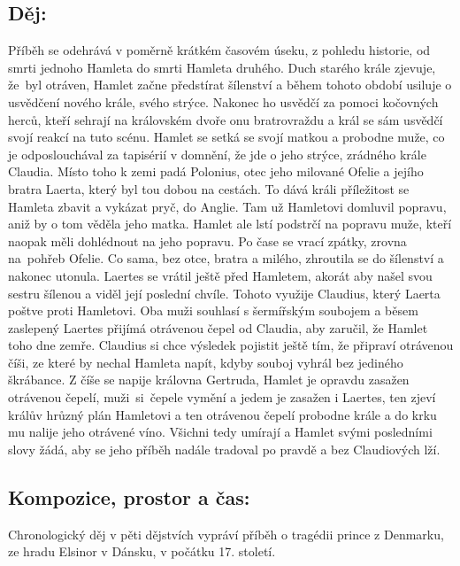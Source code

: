 \documentclass{extarticle} %
\begin{document}
\subsection*{Děj:}
\noindent 
Příběh se odehrává v poměrně krátkém časovém úseku, z pohledu historie, od smrti jednoho Hamleta do smrti Hamleta druhého.
Duch starého krále zjevuje, že~byl otráven, Hamlet začne předstírat šílenství a během tohoto období usiluje o usvědčení nového krále, svého strýce.
Nakonec ho usvědčí za pomoci kočovných herců, kteří sehrají na královském dvoře onu bratrovraždu a král se sám usvědčí svojí reakcí na tuto scénu.
Hamlet se setká se svojí matkou a probodne muže, co je odposlouchával za tapisérií v domnění, že jde o jeho strýce, zrádného krále Claudia.
Místo toho k zemi padá Polonius, otec jeho milované Ofelie a jejího bratra Laerta, který byl tou dobou na cestách.
To dává králi příležitost se Hamleta zbavit a vykázat pryč, do Anglie.
Tam už Hamletovi domluvil popravu, aniž by o tom věděla jeho matka.
Hamlet ale lstí podstrčí na popravu muže, kteří naopak měli dohlédnout na jeho popravu.
Po čase se vrací zpátky, zrovna na~pohřeb Ofelie. Co sama, bez otce, bratra a milého, zhroutila se do šílenství a nakonec utonula.
Laertes se vrátil ještě před Hamletem, akorát aby našel svou sestru šílenou a viděl její poslední chvíle.
Tohoto využije Claudius, který Laerta poštve proti Hamletovi.
Oba muži souhlasí s šermířským soubojem a běsem zaslepený Laertes přijímá otrávenou čepel od Claudia, aby zaručil, že Hamlet toho dne zemře.
Claudius si chce výsledek pojistit ještě tím, že připraví otrávenou číši, ze které by nechal Hamleta napít, kdyby souboj vyhrál bez jediného škrábance.
Z číše se napije královna Gertruda, Hamlet je opravdu zasažen otrávenou čepelí, muži~si~čepele vymění a jedem je zasažen i Laertes, ten zjeví králův hrůzný plán Hamletovi a ten otrávenou čepelí probodne krále a do krku mu nalije jeho otrávené víno.
Všichni tedy umírají a Hamlet svými posledními slovy žádá, aby se jeho příběh nadále tradoval po pravdě a bez Claudiových lží.

\subsection*{Kompozice, prostor a čas:}
\noindent 
Chronologický děj v pěti dějstvích vypráví příběh o tragédii prince z Denmarku, ze hradu Elsinor v Dánsku, v počátku 17. století.

\end{document}
